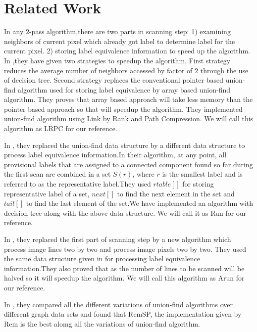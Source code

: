 \section{Related Work}
\label{sec:relatedworks}

In any $2$-pass algorithm,there are two parts in scanning step: 1) examining neighbors of current pixel which already
got label to determine label for the current pixel. 2) storing label equivalence information to speed up the algorithm. 
In \cite{Wu2009_LRPC},they have given two strategies to speedup the algorithm. First strategy reduces the average number
of neighbors accessed by factor of $2$ through the use of decision tree. Second strategy replaces the conventional pointer
based union-find algorithm used for storing label equivalence by array based union-find algorithm. They proves that array 
based approach will take less memory than the pointer based approach so that will speedup the algorithm. They implemented
union-find algorithm using Link by Rank and Path Compression. We will call this algorithm as LRPC for our reference.

In \cite{He2008_Run}, they replaced the union-find data structure by a different data structure to process label 
equivalence information.In their algorithm, at any point, all provisional labels that are assigned to a connected 
component found so far during the first scan are combined in a set $S(r)$, where $r$ is the smallest label and is 
referred to as the representative label.They used $rtable[]$ for storing representative label of a set, $next[]$ to 
find the next element in the set and $tail[]$ to find the last element of the set.We have implemented an algorithm 
with decision tree along with the above data structure. We will call it as Run for our reference.

In \cite{He2012_ARun}, they replaced the first part of scanning step by a new algorithm which process image lines two
by two and process image pixels two by two. They used the same data structure given in \cite{He2008_Run} for 
processing label equivalence information.They also proved that as the number of lines to be scanned will be halved so 
it will speedup the algorithm. We will call this algorithm as Arun for our reference.

In \cite{Patwary2010_RemSP}, they compared all the different variations of union-find algorithms over different graph 
data sets and found that RemSP, the implementation given by Rem is the best alomg all the variations of union-find 
algorithm.

